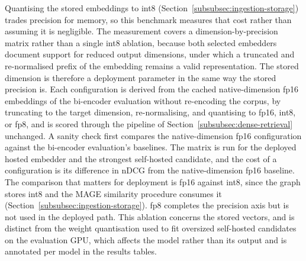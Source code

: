 Quantising the stored embeddings to int8 (Section~\ref{subsubsec:ingestion-storage}) trades precision for memory, so this benchmark measures that cost rather than assuming it is negligible. The measurement covers a dimension-by-precision matrix rather than a single int8 ablation, because both selected embedders document support for reduced output dimensions, under which a truncated and re-normalised prefix of the embedding remains a valid representation. The stored dimension is therefore a deployment parameter in the same way the stored precision is. Each configuration is derived from the cached native-dimension fp16 embeddings of the bi-encoder evaluation without re-encoding the corpus, by truncating to the target dimension, re-normalising, and quantising to fp16, int8, or fp8, and is scored through the pipeline of Section~\ref{subsubsec:dense-retrieval} unchanged. A sanity check first compares the native-dimension fp16 configuration against the bi-encoder evaluation's baselines. The matrix is run for the deployed hosted embedder and the strongest self-hosted candidate, and the cost of a configuration is its difference in nDCG from the native-dimension fp16 baseline. The comparison that matters for deployment is fp16 against int8, since the graph stores int8 and the MAGE similarity procedure consumes it (Section~\ref{subsubsec:ingestion-storage}). fp8 completes the precision axis but is not used in the deployed path. This ablation concerns the stored vectors, and is distinct from the weight quantisation used to fit oversized self-hosted candidates on the evaluation GPU, which affects the model rather than its output and is annotated per model in the results tables.

